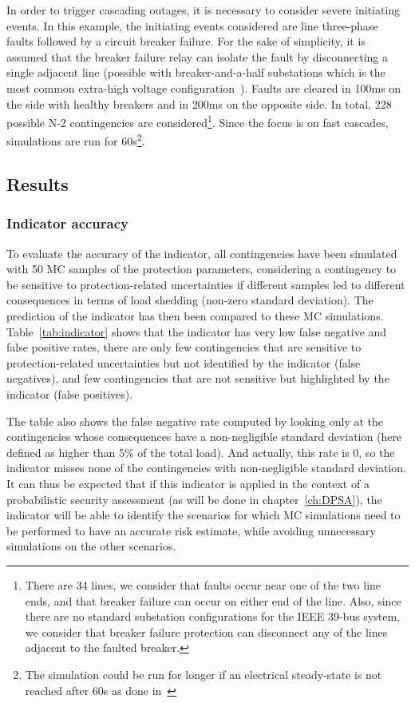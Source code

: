 In order to trigger cascading outages, it is necessary to consider severe initiating events. In this example, the initiating events considered are line three-phase faults followed by a circuit breaker failure. For the sake of simplicity, it is assumed that the breaker failure relay can isolate the fault by disconnecting a single adjacent line (possible with breaker-and-a-half substations which is the most common extra-high voltage configuration~\cite{HorowitzBook}). Faults are cleared in 100ms on the side with healthy breakers and in 200ms on the opposite side. In total, 228 possible N-2 contingencies are considered\footnote{There are 34 lines, we consider that faults occur near one of the two line ends, and that breaker failure can occur on either end of the line. Also, since there are no standard substation configurations for the IEEE 39-bus system, we consider that breaker failure protection can disconnect any of the lines adjacent to the faulted breaker.}. Since the focus is on fast cascades, simulations are run for 60s\footnote{The simulation could be run for longer if an electrical steady-state is not reached after 60s as done in~\cite{DCATphase1, MCDETasTool}}.


\subsection{Results}
\label{sec:protection_results}

\subsubsection{Indicator accuracy}

To evaluate the accuracy of the indicator, all contingencies have been simulated with 50 MC samples of the protection parameters, considering a contingency to be sensitive to protection-related uncertainties if different samples led to different consequences in terms of load shedding (\ie non-zero standard deviation). The prediction of the indicator has then been compared to these MC simulations. Table~\ref{tab:indicator} shows that the indicator has very low false negative and false positive rates, \ie there are only few contingencies that are sensitive to protection-related uncertainties but not identified by the indicator (false negatives), and few contingencies that are not sensitive but highlighted by the indicator (false positives).

The table also shows the false negative rate computed by looking only at the contingencies whose consequences have a non-negligible standard deviation (here defined as higher than 5\% of the total load). And actually, this rate is 0, so the indicator misses none of the contingencies with non-negligible standard deviation. It can thus be expected that if this indicator is applied in the context of a probabilistic security assessment (as will be done in chapter~\ref{ch:DPSA}), the indicator will be able to identify the scenarios for which MC simulations need to be performed to have an accurate risk estimate, while avoiding unnecessary simulations on the other scenarios.

